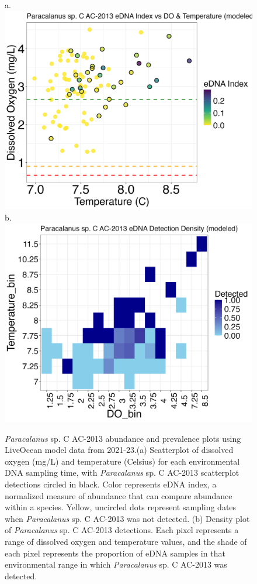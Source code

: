 \documentclass[12pt,twoside]{reedthesis}
\begin{document}
	
	\begin{figure}[!h]
		\begin{center}
			a. \includegraphics[scale=0.3]{Paracalanus_Scatter_AllYr_mod_noOut} 
			b. \includegraphics[scale=0.3]{Paracalanus_Density_AllYr_mod} 
			\caption[\textit{Paracalanus} sp. C AC-2013 scatterplot and density plot]{\footnotesize{\textit{Paracalanus} sp. C AC-2013 abundance and prevalence plots using LiveOcean model data from 2021-23.(a) Scatterplot of dissolved oxygen (mg/L) and temperature (Celsius) for each environmental DNA sampling time, with \textit{Paracalanus} sp. C AC-2013 scatterplot detections circled in black. Color represents eDNA index, a normalized measure of abundance that can compare abundance within a species. Yellow, uncircled dots represent sampling dates when \textit{Paracalanus} sp. C AC-2013 was not detected. (b) Density plot of \textit{Paracalanus} sp. C AC-2013 detections. Each pixel represents a range of dissolved oxygen and temperature values, and the shade of each pixel represents the proportion of eDNA samples in that environmental range in which \textit{Paracalanus} sp. C AC-2013 was detected. }} %

\end{center}
\end{figure}
\end{document}
